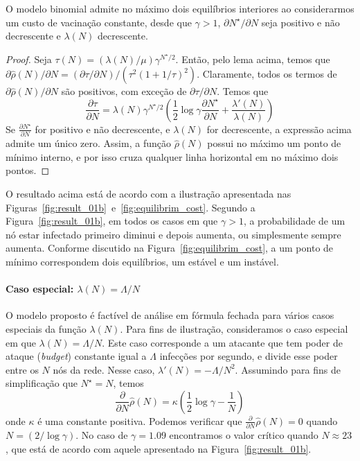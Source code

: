         \begin{thm}
            O modelo binomial admite no máximo dois equilíbrios interiores ao considerarmos um custo de vacinação constante, desde que $\gamma>1$, $\partial N^{\star}/\partial N$ seja positivo e não decrescente e $\lambda(N)$ decrescente.     \label{thm:main}
        \end{thm}
        \begin{proof}
            Seja $\tau(N)= (\lambda(N)/\mu)\gamma^{N^{\star}/2}$. Então, pelo lema acima, temos que $\partial \hat \rho(N)/\partial N =  (\partial \tau/\partial N)/(\tau^2 (1+1/\tau)^2)$. Claramente, todos os termos de $\partial \hat \rho(N)/\partial N$ são positivos, com exceção de $\partial \tau/\partial N$.  Temos que
            \begin{equation}
            \frac{\partial \tau}{\partial N} = \lambda(N) \gamma^{N^{\star}/2} \left(\frac{1}{2} \log \gamma  \frac{\partial N^{\star}}{\partial N} + \frac{\lambda'(N)}{\lambda(N)}   \right)
            \end{equation}
            Se $ \frac{\partial N^{\star}}{\partial N} $ for positivo e não decrescente, e $\lambda(N)$  for decrescente, a expressão acima admite um único zero.  Assim, a função $\hat \rho(N)$ possui no máximo um ponto de mínimo interno, e por isso cruza qualquer linha horizontal em no máximo dois pontos.   
        \end{proof}
        O resultado acima está de acordo com a ilustração apresentada nas Figuras~\ref{fig:result_01b}~e~\ref{fig:equilibrim_cost}. Segundo a Figura~\ref{fig:result_01b}, em todos os casos em que $\gamma > 1$, a probabilidade de um nó estar infectado primeiro diminui e depois aumenta, ou simplesmente sempre aumenta.  Conforme discutido na Figura~\ref{fig:equilibrim_cost}, a um ponto de mínimo correspondem dois equilíbrios, um estável e um instável. 

        \paragraph*{Caso especial: $\lambda(N)=\Lambda/N$}
        O modelo proposto é factível de análise em fórmula fechada para vários casos especiais da função $\lambda(N)$. Para fins de ilustração, consideramos o caso especial em que $\lambda(N)=\Lambda/N$.  Este caso corresponde a um atacante que tem poder de ataque (\emph{budget}) constante igual a $\Lambda$ infecções por segundo, e divide esse poder entre os $N$ nós da rede. Nesse caso, $\lambda' (N) = -\Lambda/N^2$. Assumindo para fins de simplificação que  $N^{\star}=N$, temos
		\begin{equation}
			\frac{\partial}{\partial N}\hat{\rho}(N)  = \kappa \left( \frac{1}{2} \log \gamma - \frac{1}{N} \right)
		\end{equation}
		onde $\kappa$ é uma constante positiva. 
		Podemos verificar que $\frac{\partial}{\partial N}\hat{\rho}(N)=0$ quando $N = (2 / \log \gamma)$. %
		No caso de $\gamma = 1.09$ encontramos o valor crítico quando $N \approx 23$, que está de acordo com aquele apresentado na Figura~\ref{fig:result_01b}. 

